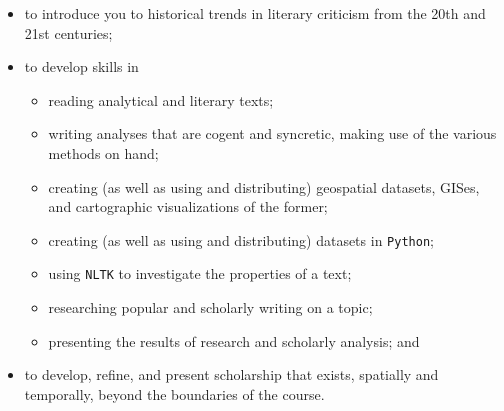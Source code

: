 \begin{itemize}

	\item to introduce you to historical trends in literary criticism from the 20th and 21st centuries; 

  \item to develop skills in 

    \begin{itemize}

			\item reading analytical and literary texts;

			\item writing analyses that are cogent and syncretic, making use of the
various methods on hand;

			\item creating (as well as using and distributing) geospatial datasets,
GISes, and cartographic visualizations of the former; 

      \item creating (as well as using and distributing) datasets in \texttt{Python};

      \item using \texttt{NLTK} to investigate the properties of a text;
        
      \item researching popular and scholarly writing on a topic;
        
      \item presenting the results of research and scholarly analysis; and

    \end{itemize}

	\item to develop, refine, and present scholarship that exists, spatially and
temporally, beyond the boundaries of the course.

\end{itemize}
